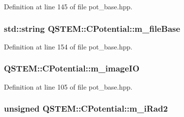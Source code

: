 Definition at line 145 of file pot\-\_\-base.\-hpp.

\hypertarget{class_q_s_t_e_m_1_1_c_potential_a7accc8d9ba35f95f9a6f667096d3fe51}{
\subsubsection[{m\-\_\-file\-Base}]{\setlength{\rightskip}{0pt plus 5cm}std\-::string Q\-S\-T\-E\-M\-::\-C\-Potential\-::m\-\_\-file\-Base\hspace{0.3cm}{\ttfamily [protected]}}}\label{class_q_s_t_e_m_1_1_c_potential_a7accc8d9ba35f95f9a6f667096d3fe51}


Definition at line 154 of file pot\-\_\-base.\-hpp.

\hypertarget{class_q_s_t_e_m_1_1_c_potential_a09c896379526b58852fe858eb4e4e7de}{
\subsubsection[{m\-\_\-image\-I\-O}]{ Q\-S\-T\-E\-M\-::\-C\-Potential\-::m\-\_\-image\-I\-O\hspace{0.3cm}{\ttfamily [protected]}}}\label{class_q_s_t_e_m_1_1_c_potential_a09c896379526b58852fe858eb4e4e7de}


Definition at line 105 of file pot\-\_\-base.\-hpp.

\hypertarget{class_q_s_t_e_m_1_1_c_potential_ac1a9386f71b9c105b257d7713d1823cc}{
\subsubsection[{m\-\_\-i\-Rad2}]{\setlength{\rightskip}{0pt plus 5cm}unsigned Q\-S\-T\-E\-M\-::\-C\-Potential\-::m\-\_\-i\-Rad2\hspace{0.3cm}{\ttfamily [protected]}}}\label{class_q_s_t_e_m_1_1_c_potential_ac1a9386f71b9c105b257d7713d1823cc}


